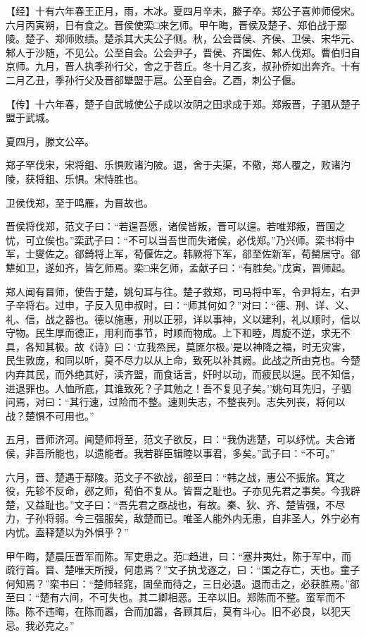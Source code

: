 \documentclass[]{article}
\begin{document}
【经】十有六年春王正月，雨，木冰。夏四月辛未，滕子卒。郑公子喜帅师侵宋。六月丙寅朔，日有食之。晋侯使栾□来乞师。甲午晦，晋侯及楚子、郑伯战于鄢陵。楚子、郑师败绩。楚杀其大夫公子侧。秋，公会晋侯、齐侯、卫侯、宋华元、邾人于沙随，不见公。公至自会。公会尹子，晋侯、齐国佐、邾人伐郑。曹伯归自京师。九月，晋人执季孙行父，舍之于苕丘。冬十月乙亥，叔孙侨如出奔齐。十有二月乙丑，季孙行父及晋郤犨盟于扈。公至自会。乙酉，刺公子偃。

【传】十六年春，楚子自武城使公子成以汝阴之田求成于郑。郑叛晋，子驷从楚子盟于武城。

夏四月，滕文公卒。

郑子罕伐宋，宋将鉏、乐惧败诸汋陂。退，舍于夫渠，不儆，郑人覆之，败诸汋陵，获将鉏、乐惧。宋恃胜也。

卫侯伐郑，至于鸣雁，为晋故也。

晋侯将伐郑，范文子曰：``若逞吾愿，诸侯皆叛，晋可以逞。若唯郑叛，晋国之忧，可立俟也。''栾武子曰：``不可以当吾世而失诸侯，必伐郑。''乃兴师。栾书将中军，士燮佐之。郤錡将上军，荀偃佐之。韩厥将下军，郤至佐新军，荀罃居守。郤犨如卫，遂如齐，皆乞师焉。栾□来乞师，孟献子曰：``有胜矣。''戊寅，晋师起。

郑人闻有晋师，使告于楚，姚句耳与往。楚子救郑，司马将中军，令尹将左，右尹子辛将右。过申，子反入见申叔时，曰：``师其何如？''对曰：``德、刑、详、义、礼、信，战之器也。德以施惠，刑以正邪，详以事神，义以建利，礼以顺时，信以守物。民生厚而德正，用利而事节，时顺而物成。上下和睦，周旋不逆，求无不具，各知其极。故《诗》曰：`立我烝民，莫匪尔极。'是以神降之福，时无灾害，民生敦庞，和同以听，莫不尽力以从上命，致死以补其阙。此战之所由克也。今楚内弃其民，而外绝其好，渎齐盟，而食话言，奸时以动，而疲民以逞。民不知信，进退罪也。人恤所底，其谁致死？子其勉之！吾不复见子矣。''姚句耳先归，子驷问焉，对曰：``其行速，过险而不整。速则失志，不整丧列。志失列丧，将何以战？楚惧不可用也。''

五月，晋师济河。闻楚师将至，范文子欲反，曰：``我伪逃楚，可以纾忧。夫合诸侯，非吾所能也，以遗能者。我若群臣辑睦以事君，多矣。''武子曰：``不可。''

六月，晋、楚遇于鄢陵。范文子不欲战，郤至曰：``韩之战，惠公不振旅。箕之役，先轸不反命，邲之师，荀伯不复从。皆晋之耻也。子亦见先君之事矣。今我辟楚，又益耻也。''文子曰：``吾先君之亟战也，有故。秦、狄、齐、楚皆强，不尽力，子孙将弱。今三强服矣，敌楚而已。唯圣人能外内无患，自非圣人，外宁必有内忧。盍释楚以为外惧乎？''

甲午晦，楚晨压晋军而陈。军吏患之。范□趋进，曰：``塞井夷灶，陈于军中，而疏行首。晋、楚唯天所授，何患焉？''文子执戈逐之，曰：``国之存亡，天也。童子何知焉？''栾书曰：``楚师轻窕，固垒而待之，三日必退。退而击之，必获胜焉。''郤至曰：``楚有六间，不可失也。其二卿相恶。王卒以旧。郑陈而不整。蛮军而不陈。陈不违晦，在陈而嚣，合而加嚣，各顾其后，莫有斗心。旧不必良，以犯天忌。我必克之。''
\end{document}

